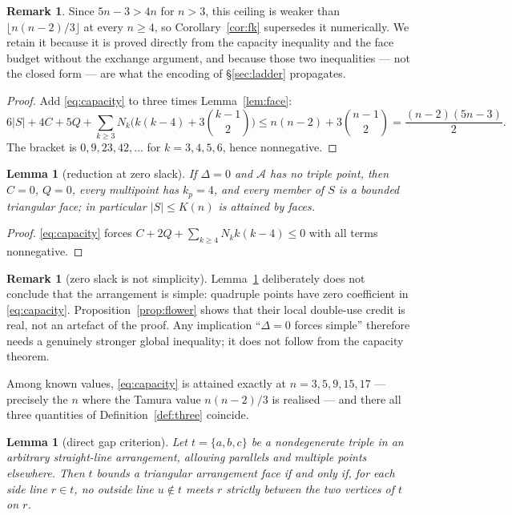 \documentclass[11pt]{article}
\newtheorem{lemma}[theorem]{Lemma}
\theoremstyle{definition}
\newtheorem{remark}[theorem]{Remark}
\newcommand{\Nk}{N_k}
\begin{document}
\begin{remark}\label{rem:ceiling-super}
Since $5n-3>4n$ for $n>3$, this ceiling is weaker than
$\lfloor n(n-2)/3\rfloor$ at every $n\ge4$, so Corollary~\ref{cor:fk}
supersedes it numerically. We retain it because it is proved directly from
the capacity inequality and the face budget without the exchange argument,
and because those two inequalities --- not the closed form --- are what the
encoding of \S\ref{sec:ladder} propagates.
\end{remark}


\begin{proof}
Add \eqref{eq:capacity} to three times Lemma~\ref{lem:face}:
\[
 6|S|+4C+5Q+\sum_{k\ge3}\Nk\Big(k(k-4)+3\binom{k-1}{2}\Big)\le
 n(n-2)+3\binom{n-1}{2}=\frac{(n-2)(5n-3)}{2}.
\]
The bracket is $0,9,23,42,\dots$ for $k=3,4,5,6$, hence nonnegative.
\end{proof}

\begin{lemma}[reduction at zero slack]\label{lem:reduction}
If $\Delta=0$ and $\mathcal A$ has no triple point, then $C=0$, $Q=0$, every
multipoint has $k_p=4$, and every member of $S$ is a bounded triangular face;
in particular $|S|\le K(n)$ is attained by faces.
\end{lemma}

\begin{proof}
\eqref{eq:capacity} forces $C+2Q+\sum_{k\ge4}\Nk k(k-4)\le0$ with all terms
nonnegative.
\end{proof}
\begin{remark}[zero slack is not simplicity]\label{rem:zeroslack}
Lemma~\ref{lem:reduction} deliberately does not conclude that the arrangement
is simple: quadruple points have zero coefficient in
\eqref{eq:capacity}. Proposition~\ref{prop:flower} shows that their local
double-use credit is real, not an artefact of the proof. Any implication
``$\Delta=0$ forces simple'' therefore needs a genuinely stronger global
inequality; it does not follow from the capacity theorem.
\end{remark}

Among known values, \eqref{eq:capacity} is attained exactly at
$n=3,5,9,15,17$ --- precisely the $n$ where the Tamura value $n(n-2)/3$ is
realised --- and there all three quantities of Definition~\ref{def:three}
coincide.

\begin{lemma}[direct gap criterion]\label{lem:gapface}
Let $t=\{a,b,c\}$ be a nondegenerate triple in an arbitrary straight-line
arrangement, allowing parallels and multiple points elsewhere. Then $t$
bounds a triangular arrangement face if and only if, for each side line
$r\in t$, no outside line $u\notin t$ meets $r$ strictly between the two
vertices of $t$ on $r$.
\end{lemma}
\end{document}
